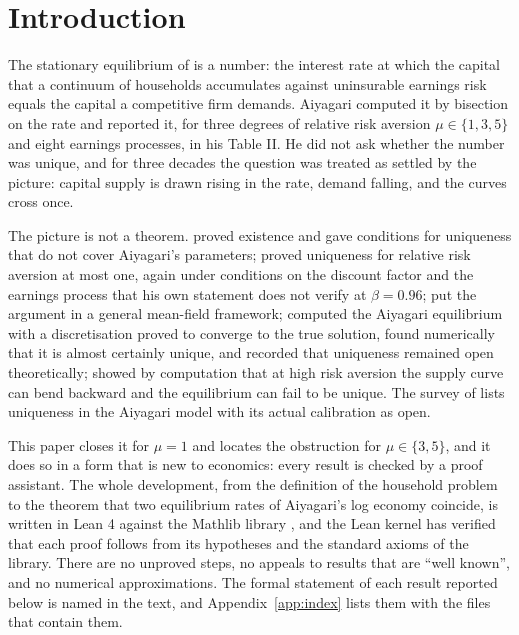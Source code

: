 \section{Introduction}

The stationary equilibrium of \citet{Aiyagari1994} is a number: the interest rate at which the
capital that a continuum of households accumulates against uninsurable earnings risk equals the
capital a competitive firm demands. Aiyagari computed it by bisection on the rate and reported it,
for three degrees of relative risk aversion $\mu\in\{1,3,5\}$ and eight earnings processes, in his
Table II. He did not ask whether the number was unique, and for three decades the question was
treated as settled by the picture: capital supply is drawn rising in the rate, demand falling, and
the curves cross once.

The picture is not a theorem. \citet{Acikgoz2018} proved existence and gave conditions for
uniqueness that do not cover Aiyagari's parameters; \citet{Light2020} proved uniqueness for
relative risk aversion at most one, again under conditions on the discount factor and the earnings
process that his own statement does not verify at $\beta=0.96$; \citet{Light2022} put the argument
in a general mean-field framework; \citet{Kirkby2019} computed the Aiyagari equilibrium with a discretisation proved to converge to
the true solution, found numerically that it is almost certainly unique, and recorded that
uniqueness remained open theoretically; \citet{YoungWalsh2025} showed by computation that at high
risk aversion the supply curve can bend backward and the equilibrium can fail to be unique. The survey
of \citet{TodaWalsh2024} lists uniqueness in the Aiyagari model with its actual calibration as
open.

This paper closes it for $\mu=1$ and locates the obstruction for $\mu\in\{3,5\}$, and it does so in
a form that is new to economics: every result is checked by a proof assistant. The whole
development, from the definition of the household problem to the theorem that two equilibrium rates
of Aiyagari's log economy coincide, is written in Lean 4 \citep{Lean4} against the Mathlib library
\citep{Mathlib}, and the Lean kernel has verified that each proof follows from its hypotheses and
the standard axioms of the library. There are no unproved steps, no appeals to results that are
``well known'', and no numerical approximations. The formal statement of each result reported below
is named in the text, and Appendix~\ref{app:index} lists them with the files that contain them.

